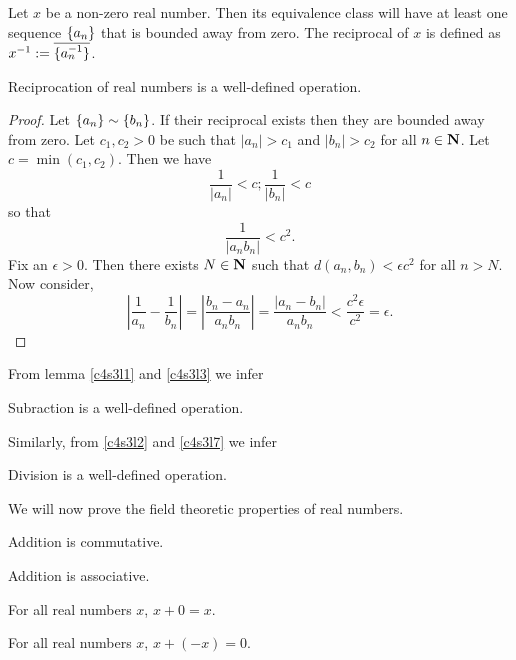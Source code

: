 \begin{defn}\label{c4s3d7}
Let $x$ be a non-zero real number. Then its equivalence class will have
at least one sequence $\{a_n\}$ that is bounded away from zero. The
reciprocal of $x$ is defined as $x^{-1} := \overline{\{a_n^{-1}\}}$.
\end{defn}

\begin{lem}\label{c4s3l7}
Reciprocation of real numbers is a well-defined operation.
\end{lem}
\begin{proof}
Let $\{a_n\} \sim \{b_n\}$. If their reciprocal exists then they
are bounded away from zero. Let $c_1, c_2 > 0$ be such that $|a_n| > c_1$
and $|b_n| > c_2$ for all $n \in \mathbf{N}$. Let $c = \min(c_1, c_2)$. Then
we have 
\[
\frac{1}{|a_n|} < c; \frac{1}{|b_n|} < c
\]
so that
\[
\frac{1}{|a_nb_n|} < c^2.
\]
Fix an $\epsilon > 0$. Then there exists $N \in \mathbf{N}$ such that $d(a_n,
b_n) < \epsilon c^2$ for all $n > N$. Now consider,
\[
\left|\frac{1}{a_n} - \frac{1}{b_n}\right| = \left|\frac{b_n - a_n}{a_nb_n}
\right| = \frac{|a_n - b_n|}{a_nb_n} < \frac{c^2\epsilon}{c^2} = 
\epsilon.
\]
\end{proof}

From lemma \ref{c4s3l1} and \ref{c4s3l3} we infer
\begin{lem}\label{c4s3l8}
Subraction is a well-defined operation.
\end{lem}

Similarly, from \ref{c4s3l2} and \ref{c4s3l7} we infer
\begin{lem}\label{c4s3l9}
Division is a well-defined operation.
\end{lem}

We will now prove the field theoretic properties of real numbers.
\begin{lem}\label{c4s3l10}
Addition is commutative.
\end{lem}

\begin{lem}\label{c4s3l11}
Addition is associative.
\end{lem}

\begin{lem}\label{c4s3l12}
For all real numbers $x$, $x + 0 = x$.
\end{lem}

\begin{lem}\label{c4s3l13}
For all real numbers $x$, $x + (-x) = 0$.
\end{lem}

